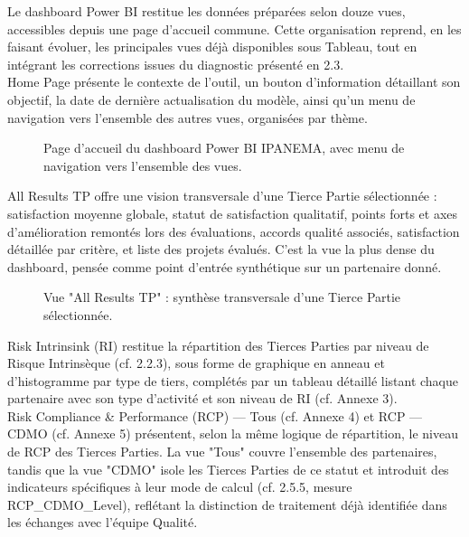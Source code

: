 Le dashboard Power BI restitue les données préparées selon douze vues, accessibles 
depuis une page d'accueil commune. Cette organisation reprend, en les faisant évoluer, 
les principales vues déjà disponibles sous Tableau, tout en intégrant les corrections 
issues du diagnostic présenté en 2.3. \\

Home Page présente le contexte de l'outil, un bouton d'information détaillant son 
objectif, la date de dernière actualisation du modèle, ainsi qu'un menu de navigation 
vers l'ensemble des autres vues, organisées par thème.

\begin{figure}[H]
    \centering
    \caption{Page d'accueil du dashboard Power BI IPANEMA, avec menu de navigation vers l'ensemble des vues. }
    \label{Page_d'accueil_du_dashboard_Power_BI_IPANEMA}
\end{figure}

All Results TP offre une vision transversale d'une Tierce Partie sélectionnée : 
satisfaction moyenne globale, statut de satisfaction qualitatif, points forts et axes 
d'amélioration remontés lors des évaluations, accords qualité associés, satisfaction 
détaillée par critère, et liste des projets évalués. C'est la vue la plus dense du 
dashboard, pensée comme point d'entrée synthétique sur un partenaire donné.

\begin{figure}[H]
    \centering
    \caption{Vue "All Results TP" : synthèse transversale d'une Tierce Partie sélectionnée.}
    \label{All_results_TP}
\end{figure}

Risk Intrinsink (RI) restitue la répartition des Tierces Parties par niveau de Risque 
Intrinsèque (cf. 2.2.3), sous forme de graphique en anneau et d'histogramme par type 
de tiers, complétés par un tableau détaillé listant chaque partenaire avec son type 
d'activité et son niveau de RI (cf. Annexe 3). \\

Risk Compliance \& Performance (RCP) — Tous (cf. Annexe 4) et RCP — CDMO (cf. 
Annexe 5) présentent, selon la même logique de répartition, le niveau de RCP des 
Tierces Parties. La vue "Tous" couvre l'ensemble des partenaires, tandis que la vue 
"CDMO" isole les Tierces Parties de ce statut et introduit des indicateurs spécifiques à 
leur mode de calcul (cf. 2.5.5, mesure RCP\_CDMO\_Level), reflétant la distinction de 
traitement déjà identifiée dans les échanges avec l'équipe Qualité. \\

